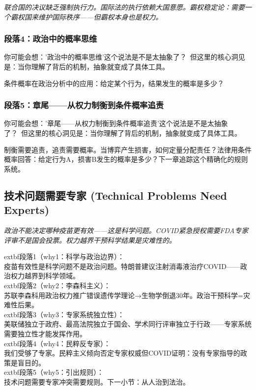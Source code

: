 \documentclass[a4paper,12pt]{book}
\newenvironment{motivation}{\begin{tcolorbox}[colback=gray!10,colframe=gray!60,title=\textit{本章动机},fonttitle=\bfseries,arc=0mm,leftrule=3mm]\small\itshape}{\end{tcolorbox}}
\begin{document}
\begin{motivation}
\begin{motivation}
\begin{motivation}
联合国的决议缺乏强制执行力。国际法的执行依赖大国意愿。霸权稳定论：需要一个霸权国来维护国际秩序——但霸权本身也是权力。

	\subsubsection*{段落4：政治中的概率思维}

	\begin{tcolorbox}[colback=yellow!5, title=\textit{读者行为预测}]
		你可能会想：'政治中的概率思维'这个说法是不是太抽象了？\ 但这里的核心洞见是：当你理解了背后的机制，抽象就变成了具体工具。
	\end{tcolorbox}

条件概率在政治分析中的应用：给定某个行为，结果发生的概率是多少？

	\subsubsection*{段落5：章尾——从权力制衡到条件概率追责}

	\begin{tcolorbox}[colback=yellow!5, title=\textit{读者行为预测}]
		你可能会想：'章尾——从权力制衡到条件概率追责'这个说法是不是太抽象了？\ 但这里的核心洞见是：当你理解了背后的机制，抽象就变成了具体工具。
	\end{tcolorbox}

制衡需要追责，追责需要概率。当博弈产生损害，如何定量分配责任？法律用条件概率回答：给定行为A，损害B发生的概率是多少？下一章追踪这个精确化的规则系统。

	
	\subsection{技术问题需要专家 (Technical Problems Need Experts)}
	\begin{motivation}政治不能决定哪种疫苗更有效——这是科学问题。COVID紧急授权需要FDA专家评审不是国会投票。权力越界干预科学结果是灾难性的。\end{motivation}
		extbf{段落1（why1：科学与政治边界）}：\\疫苗有效性是科学问题不是政治问题。特朗普建议注射消毒液治疗COVID——政治权力越界到科学领域。\\	extbf{段落2（why2：李森科主义）}：\\苏联李森科用政治权力推广错误遗传学理论→生物学倒退30年。政治干预科学=灾难性后果。\\	extbf{段落3（why3：专家系统独立性）}：\\美联储独立于政府、最高法院独立于国会、学术同行评审独立于行政——专家系统需要独立性才能发挥作用。\\	extbf{段落4（why4：民粹反专家）}：\\我们受够了专家。民粹主义倾向否定专家权威但COVID证明：没有专家指导的政策是盲目的。\\	extbf{段落5（why5：引出规则）}：\\技术问题需要专家冲突需要规则。下一小节：从人治到法治。


\end{motivation}
\end{motivation}
\end{motivation}
\end{document}

